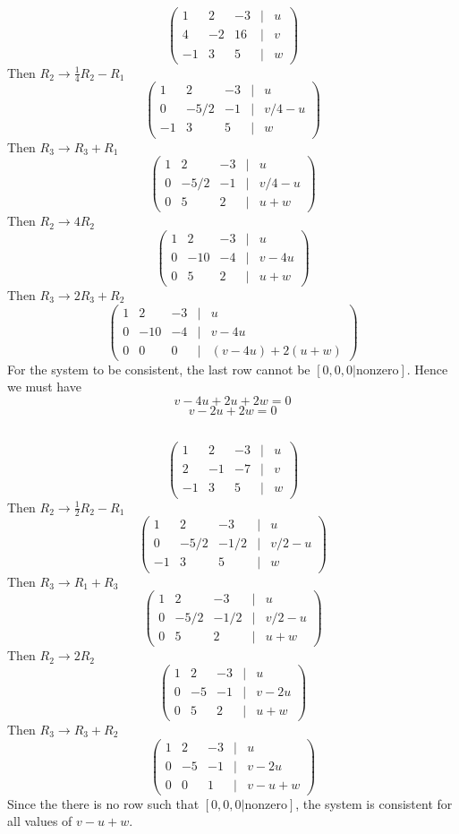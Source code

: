 \documentclass{article}
\begin{document}
\subsection{}
\[\begin{pmatrix}
    1&2&-3&|&u \\ 4&-2&16&|&v \\ -1&3&5&|&w
\end{pmatrix}\]
Then \(R_2 \rightarrow \frac{1}{4}R_2 - R_1\)
\[\begin{pmatrix}
    1&2&-3&|&u \\ 0&-5/2&-1&|&v/4 - u \\ -1&3&5&|&w
\end{pmatrix}\]
Then \(R_3 \rightarrow R_3 + R_1\)
\[\begin{pmatrix}
    1&2&-3&|&u \\ 0&-5/2&-1&|&v/4 - u \\ 0&5&2&|&u+w
\end{pmatrix}\]
Then \(R_2\rightarrow4R_2\)
\[\begin{pmatrix}
    1&2&-3&|&u \\ 0&-10&-4&|&v-4u \\ 0&5&2&|&u+w
\end{pmatrix}\]
Then \(R_3 \rightarrow 2R_3 +R_2\)
\[\begin{pmatrix}
    1&2&-3&|&u \\ 0&-10&-4&|&v-4u \\ 0&0&0&|&(v-4u) + 2(u+w)
\end{pmatrix}\]
For the system to be consistent, the last row cannot be \([0,0,0|\text{nonzero}]\). Hence we must have 
\[v-4u+2u+2w = 0\]
\[v-2u+2w = 0\]
\subsection{}
\[\begin{pmatrix}
    1&2&-3&|&u \\ 2&-1&-7&|&v \\ -1&3&5&|&w
\end{pmatrix}\]
Then \(R_2 \rightarrow \frac{1}{2}R_2 - R_1\)
\[\begin{pmatrix}
    1&2&-3&|&u \\ 0&-5/2&-1/2&|&v/2-u \\ -1&3&5&|&w
\end{pmatrix}\]
Then \(R_3 \rightarrow R_1+R_3\)
\[\begin{pmatrix}
    1&2&-3&|&u \\ 0&-5/2&-1/2&|&v/2-u \\ 0&5&2&|&u+w
\end{pmatrix}\]
Then \(R_2 \rightarrow 2R_2\)
\[\begin{pmatrix}
    1&2&-3&|&u \\ 0&-5&-1&|&v-2u \\ 0&5&2&|&u+w
\end{pmatrix}\]
Then \(R_3 \rightarrow R_3 + R_2\)
\[\begin{pmatrix}
    1&2&-3&|&u \\ 0&-5&-1&|&v-2u \\ 0&0&1&|&v-u+w
\end{pmatrix}\]
Since the there is no row such that \([0,0,0|\text{nonzero}]\), the system is consistent for all values of \(v-u+w\). 
\end{document}
